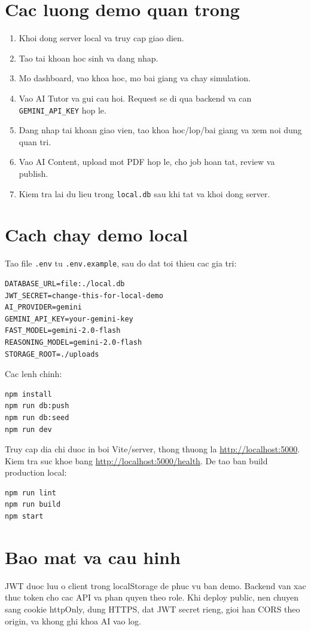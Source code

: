 \documentclass[12pt,a4paper]{article}
\begin{document}
\section{Cac luong demo quan trong}
\begin{enumerate}[leftmargin=*]
  \item Khoi dong server local va truy cap giao dien.
  \item Tao tai khoan hoc sinh va dang nhap.
  \item Mo dashboard, vao khoa hoc, mo bai giang va chay simulation.
  \item Vao AI Tutor va gui cau hoi. Request se di qua backend va can \texttt{GEMINI\_API\_KEY} hop le.
  \item Dang nhap tai khoan giao vien, tao khoa hoc/lop/bai giang va xem noi dung quan tri.
  \item Vao AI Content, upload mot PDF hop le, cho job hoan tat, review va publish.
  \item Kiem tra lai du lieu trong \texttt{local.db} sau khi tat va khoi dong server.
\end{enumerate}

\section{Cach chay demo local}
Tao file \texttt{.env} tu \texttt{.env.example}, sau do dat toi thieu cac gia tri:
\begin{lstlisting}
DATABASE_URL=file:./local.db
JWT_SECRET=change-this-for-local-demo
AI_PROVIDER=gemini
GEMINI_API_KEY=your-gemini-key
FAST_MODEL=gemini-2.0-flash
REASONING_MODEL=gemini-2.0-flash
STORAGE_ROOT=./uploads
\end{lstlisting}

Cac lenh chinh:
\begin{lstlisting}
npm install
npm run db:push
npm run db:seed
npm run dev
\end{lstlisting}

Truy cap dia chi duoc in boi Vite/server, thong thuong la \url{http://localhost:5000}. Kiem tra suc khoe bang \url{http://localhost:5000/health}. De tao ban build production local:
\begin{lstlisting}
npm run lint
npm run build
npm start
\end{lstlisting}

\section{Bao mat va cau hinh}
JWT duoc luu o client trong localStorage de phuc vu ban demo. Backend van xac thuc token cho cac API va phan quyen theo role. Khi deploy public, nen chuyen sang cookie httpOnly, dung HTTPS, dat JWT secret rieng, gioi han CORS theo origin, va khong ghi khoa AI vao log.
\end{document}
